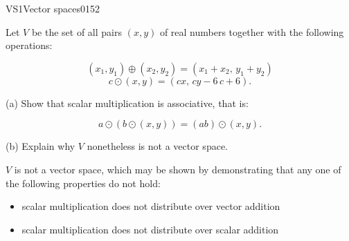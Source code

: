 \begin{exercise}{VS1}{Vector spaces}{0152} 
\begin{exerciseStatement} 

 Let \(V\) be the set of all pairs \((x,y)\) of real numbers together with the following operations: 

 \[(x_1,y_1)\oplus (x_2,y_2)=\left(x_{1} + x_{2},\,y_{1} + y_{2}\right)\]\[c \odot (x,y) =\left(c x,\,c y - 6 \, c + 6\right).\] 

 (a) Show that scalar multiplication is associative, that is: 

 \[
      a\odot(b\odot (x,y))=(ab)\odot(x,y).
    \] 

 (b) Explain why \(V\) nonetheless is not a vector space. 

 \end{exerciseStatement}
 \begin{exerciseAnswer} 

 \(V\) is not a vector space, which may be shown by demonstrating that any one of the following properties do not hold: 

 

\begin{itemize}
\item scalar multiplication does not distribute over vector addition
\item scalar multiplication does not distribute over scalar addition
\end{itemize}

     \end{exerciseAnswer}
 \end{exercise}



